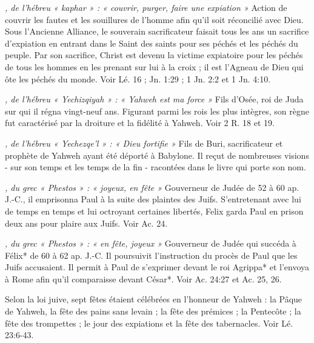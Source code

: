 \begin{multicols}{2}
\textit{, de l'hébreu « kaphar » : « couvrir, purger, faire une expiation »}\newline
Action de couvrir les fautes et les souillures de l'homme afin qu'il soit réconcilié avec Dieu. Sous l'Ancienne Alliance, le souverain sacrificateur faisait tous les ans un sacrifice d'expiation en entrant dans le Saint des saints pour ses péchés et les péchés du peuple. Par son sacrifice, Christ est devenu la victime expiatoire pour les péchés de tous les hommes en les prenant sur lui à la croix ; il est l'Agneau de Dieu qui ôte les péchés du monde. Voir Lé. 16 ; Jn. 1:29 ; 1 Jn. 2:2 et 1 Jn. 4:10.

\textit{, de l'hébreu « Yechizqiyah » : « Yahweh est ma force »}\newline
Fils d'Osée, roi de Juda sur qui il régna vingt-neuf ans. Figurant parmi les rois les plus intègres, son règne fut caractérisé par la droiture et la fidélité à Yahweh. Voir 2 R. 18 et 19.

\textit{, de l'hébreu « Yechezqe'l » : « Dieu fortifie »}\newline
Fils de Buri, sacrificateur et prophète de Yahweh ayant été déporté à Babylone. Il reçut de nombreuses visions - sur son temps et les temps de la fin - racontées dans le livre qui porte son nom.

\textit{, du grec « Phestos » : « joyeux, en fête »}\newline
Gouverneur de Judée de 52 à 60 ap. J.-C., il emprisonna Paul à la suite des plaintes des Juifs. S'entretenant avec lui de temps en temps et lui octroyant certaines libertés, Felix garda Paul en prison deux ans pour plaire aux Juifs. Voir Ac. 24.

\textit{, du grec « Phestos » : « en fête, joyeux »}\newline
Gouverneur de Judée qui succéda à Félix* de 60 à 62 ap. J.-C. Il poursuivit l'instruction du procès de Paul que les Juifs accusaient. Il permit à Paul de s'exprimer devant le roi Agrippa* et l'envoya à Rome afin qu'il comparaisse devant César*. Voir Ac. 24:27 et Ac. 25, 26.

\textit{}\newline
Selon la loi juive, sept fêtes étaient célébrées en l'honneur de Yahweh : la Pâque de Yahweh, la fête des pains sans levain ; la fête des prémices ; la Pentecôte ; la fête des trompettes ; le jour des expiations et la fête des tabernacles. Voir Lé. 23:6-43.


\end{multicols}

